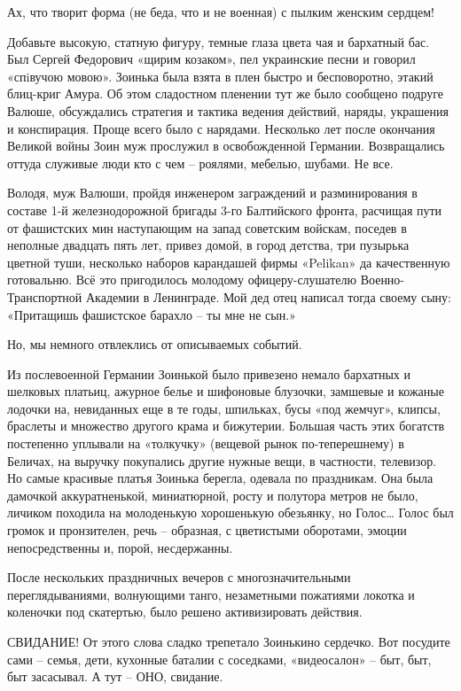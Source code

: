 Ах, что творит форма (не беда, что и не военная) с пылким женским сердцем!

Добавьте высокую, статную фигуру, темные глаза цвета чая и бархатный бас. Был
Сергей Федорович «щирим козаком», пел украинские песни и говорил «спiвучою
мовою». Зоинька была взята в плен быстро и бесповоротно, этакий блиц-криг
Амура. Об этом сладостном пленении тут же было сообщено подруге Валюше,
обсуждались стратегия и тактика ведения действий, наряды, украшения и
конспирация. Проще всего было с нарядами. Несколько лет после окончания Великой
войны Зоин муж прослужил в освобожденной Германии. Возвращались оттуда служивые
люди кто с чем – роялями, мебелью, шубами. Не все.

Володя, муж Валюши, пройдя инженером заграждений и разминирования в составе 1-й
железнодорожной бригады 3-го Балтийского фронта, расчищая пути от фашистских
мин наступающим на запад советским войскам, поседев в неполные двадцать пять
лет, привез домой, в город детства, три пузырька цветной туши, несколько
наборов карандашей фирмы «Pelikan» да качественную готовальню. Всё это
пригодилось молодому офицеру-слушателю Военно-Транспортной Академии в
Ленинграде. Мой дед отец написал тогда своему сыну: «Притащишь фашистское
барахло – ты мне не сын.»

Но, мы немного отвлеклись от описываемых событий.

Из послевоенной Германии Зоинькой было привезено немало бархатных и шелковых
платьиц, ажурное белье и шифоновые блузочки, замшевые и кожаные лодочки на,
невиданных еще в те годы, шпильках, бусы «под жемчуг», клипсы, браслеты и
множество другого крама и бижутерии. Большая часть этих богатств постепенно
уплывали на «толкучку» (вещевой рынок по-теперешнему) в Беличах, на выручку
покупались другие нужные вещи, в частности, телевизор. Но самые красивые платья
Зоинька берегла, одевала по праздникам. Она была дамочкой аккуратненькой,
миниатюрной, росту и полутора метров не было, личиком походила на молоденькую
хорошенькую обезьянку, но Голос… Голос был громок и пронзителен, речь –
образная, с цветистыми оборотами, эмоции непосредственны и, порой, несдержанны.

После нескольких праздничных вечеров с многозначительными переглядываниями,
волнующими танго, незаметными пожатиями локотка и коленочки под скатертью, было
решено активизировать действия.

СВИДАНИЕ! От этого слова сладко трепетало Зоинькино сердечко. Вот посудите сами
– семья, дети, кухонные баталии с соседками, «видеосалон» – быт, быт, быт
засасывал. А тут – ОНО, свидание.

